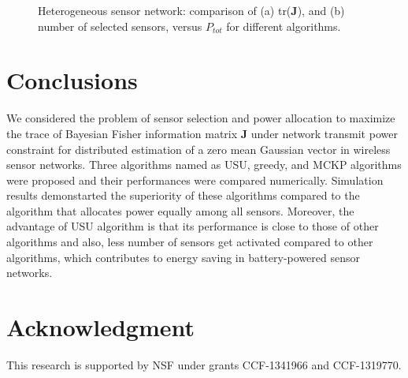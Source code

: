 \documentclass[conference]{IEEEtran}
\begin{document}
%
\begin{figure}[h]
	\centering
	\caption{Heterogeneous sensor network: comparison of (a) tr($\boldsymbol{J}$), and (b) number of selected sensors, versus $P_{tot}$ for different algorithms.}  
	\label{heterog} 
\end{figure}
% 
\section{Conclusions} \label{conclusions}
We considered the problem of sensor selection and power allocation to maximize the trace of Bayesian Fisher information matrix $\boldsymbol{J}$ under network transmit power constraint for distributed estimation of a zero mean Gaussian vector in wireless sensor networks. Three algorithms named as USU, greedy, and MCKP algorithms were proposed and their performances were compared numerically. Simulation results demonstarted the superiority of these algorithms compared to the algorithm that allocates power equally among all sensors. Moreover, the advantage of USU algorithm is that its performance is close to those of other algorithms and also, less number of sensors get activated compared to other algorithms, which contributes to energy saving in battery-powered sensor networks.  
\section*{Acknowledgment} \label{acknowledgment} 
This research is supported by NSF under grants CCF-1341966 and CCF-1319770.


%
%
\end{document}
